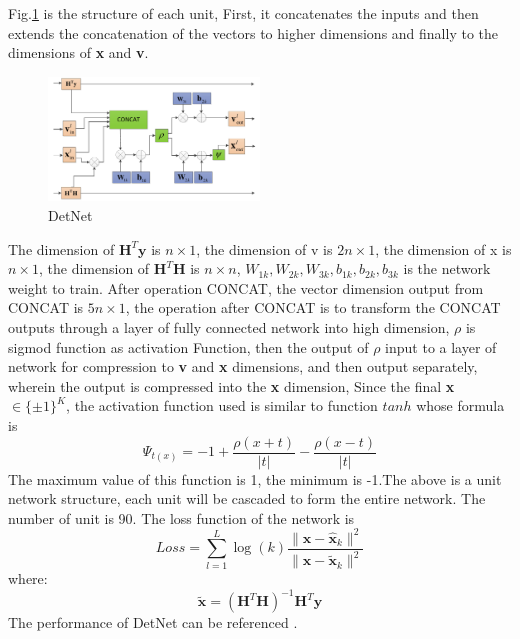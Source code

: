 \documentclass[conference]{IEEEtran}
\begin{document}
Fig.\ref{DetNet unit} is the structure of each unit, First, it concatenates the inputs and then extends the concatenation of the vectors to higher dimensions and finally to the dimensions of \textbf{x} and \textbf{v}.

\begin{figure}[ht]
  \centering
  \includegraphics[width=0.5\textwidth]{DetNet.pdf}
  \caption{DetNet}
  \label{DetNet unit}
\end{figure}

The dimension of ${\textbf{H}^T\textbf{y}}$ is ${n \times 1}$, the dimension of v is ${2n \times 1}$, the dimension of x is ${n \times 1}$, the dimension of ${\textbf{H}^T\textbf{H}}$ is ${n \times n}$, ${W_{1k}, W_{2k}, W_{3k}, b_{1k}, b_{2k}, b_{3k}}$ is the network weight to train. After operation CONCAT, the vector dimension output from CONCAT is ${5n \times 1}$, the operation after CONCAT is to transform the CONCAT outputs through a layer of fully connected network into high dimension, $\rho$ is sigmod function as activation Function, then the output of $\rho$ input to a layer of network for compression to \textbf{v} and \textbf{x} dimensions, and then output separately, wherein the output is compressed into the \textbf{x} dimension, Since the final \textbf{x}${\in\{\pm1\}^K}$, the activation function used is similar to function $tanh$ whose formula is
\begin{equation}
\label{twoValueFunction}
\Psi_{t\left(x\right)}=-1+\frac{\rho\left(x+t\right)}{|t|}-\frac{\rho\left(x-t\right)}{|t|}
\end{equation}
The maximum value of this function is 1, the minimum is -1.The above is a unit network structure, each unit will be cascaded to form the entire network. The number of unit is 90.
The loss function of the network is
\begin{equation}
\label{lossFunction}
Loss=\sum_{l=1}^L\log\left(k\right)\frac{\|\textbf{x}-\hat{\textbf{x}}_k\|^2}{\|\textbf{x}-\widetilde{\textbf{x}}_k\|^2}
\end{equation}
where:
\begin{equation}
\label{lossFunction}
\widetilde{\textbf{x}}=\left(\textbf{H}^T\textbf{H}\right)^{-1}\textbf{H}^T\textbf{y}
\end{equation}
The performance of DetNet can be referenced \cite{DetNet}.
\end{document}

